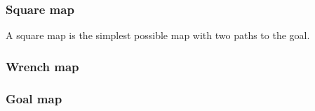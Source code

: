 \subsubsection{Square map}
A square map is the simplest possible map with two paths to the goal.
% 
\subsubsection{Wrench map}


\subsubsection{Goal map}

% 
